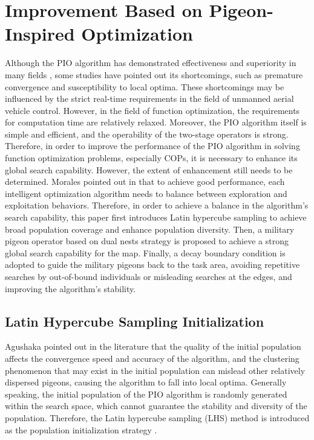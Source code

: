 \documentclass[preprint,review,compress,12pt]{elsarticle}
\begin{document}
\section{Improvement Based on Pigeon-Inspired Optimization}
Although the PIO algorithm has demonstrated effectiveness and superiority in many fields \cite{haibin2017progresses}, some studies \cite{yuan2022active,liu2023unmanned} have pointed out its shortcomings, such as premature convergence and susceptibility to local optima. These shortcomings may be influenced by the strict real-time requirements in the field of unmanned aerial vehicle control. However, in the field of function optimization, the requirements for computation time are relatively relaxed. Moreover, the PIO algorithm itself is simple and efficient, and the operability of the two-stage operators is strong. Therefore, in order to improve the performance of the PIO algorithm in solving function optimization problems, especially COPs, it is necessary to enhance its global search capability. However, the extent of enhancement still needs to be determined. Morales pointed out in \cite{morales2020better} that to achieve good performance, each intelligent optimization algorithm needs to balance between exploration and exploitation behaviors. Therefore, in order to achieve a balance in the algorithm's search capability, this paper first introduces Latin hypercube sampling to achieve broad population coverage and enhance population diversity. Then, a military pigeon operator based on dual nests strategy is proposed to achieve a strong global search capability for the map. Finally, a decay boundary condition is adopted to guide the military pigeons back to the task area, avoiding repetitive searches by out-of-bound individuals or misleading searches at the edges, and improving the algorithm's stability.

\subsection{Latin Hypercube Sampling Initialization}
Agushaka pointed out in the literature \cite{agushaka2023efficient} that the quality of the initial population affects the convergence speed and accuracy of the algorithm, and the clustering phenomenon that may exist in the initial population can mislead other relatively dispersed pigeons, causing the algorithm to fall into local optima. Generally speaking, the initial population of the PIO algorithm is randomly generated within the search space, which cannot guarantee the stability and diversity of the population. Therefore, the Latin hypercube sampling (LHS) method is introduced as the population initialization strategy \cite{roomi2021multi, xiao2023application}.
\end{document}
